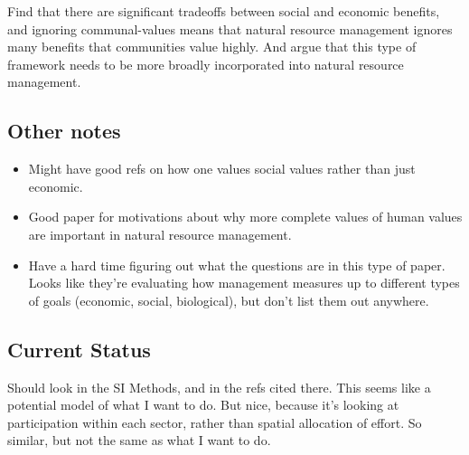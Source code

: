 \documentclass[a4paper,10pt]{article}
\begin{document}
\noindent Find that there are significant tradeoffs between social and economic benefits, and ignoring communal-values means that  natural resource management ignores many benefits that communities value highly. And argue that this type of framework needs to be more broadly incorporated into natural resource management. 
\subsection*{Other notes}
\begin{itemize}
\item Might have good refs on how one values social values rather than just economic.
\item Good paper for motivations about why more complete values of human values are important in natural resource management. 
\item Have a hard time figuring out what the questions are in this type of paper. Looks like they're evaluating how management measures up to different types of goals (economic, social, biological), but don't list them out anywhere. 
\end{itemize}

\subsection*{Current Status}
Should look in the SI Methods, and in the refs cited there. This seems like a potential model of what I want to do. But nice, because it's looking at participation within each sector, rather than spatial allocation of effort. So similar, but not the same as what I want to do. 



\end{document}

